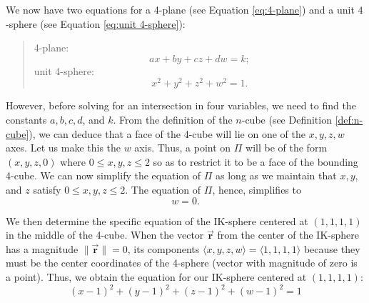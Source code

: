 We now have two equations for a 4-plane (see Equation \ref{eq:4-plane}) and a unit $4$-sphere (see Equation \ref{eq:unit 4-sphere}):
\begin{quote}
    4-plane:$$ax+by+cz+dw=k;$$
    unit 4-sphere: $$x^2+y^2+z^2+w^2=1.$$
\end{quote}

\noindent
However, before solving for an intersection in four variables, we need to find the constants $a, b, c, d$, and $k$. From the definition of the $n$-cube (see Definition \ref{def:n-cube}), we can deduce that a face of the 4-cube will lie on one of the $x, y, z, w$ axes. Let us make this the $w$ axis. Thus, a point on $\Pi$ will be of the form $(x, y, z, 0)$ where $0\leq x, y, z \leq 2$ so as to restrict it to be a face of the bounding 4-cube. We can now simplify the equation of $\Pi$ as long as we maintain that $x, y$, and $z$ satisfy $0\leq x, y, z \leq 2$. The equation of $\Pi$, hence,  simplifies to
\begin{equation}\label{eq:cube face}
    w=0.
\end{equation}

We then determine the specific equation of the IK-sphere centered at $(1, 1, 1, 1)$ in the middle of the 4-cube. When the vector $\Vec{\mathbf{r}}$ from the center of the IK-sphere has a magnitude $\lVert\Vec{\mathbf{r}}\rVert=0$, its components $\langle x, y, z, w\rangle=\langle 1, 1, 1, 1\rangle$ because they must be the center coordinates of the 4-sphere (vector with magnitude of zero is a point). Thus, we obtain the equation for our IK-sphere centered at $(1, 1, 1, 1)$:
\begin{equation}\label{eq:IK 4 sphere centered at 1}
    (x-1)^2+(y-1)^2+(z-1)^2+(w-1)^2=1
\end{equation}

